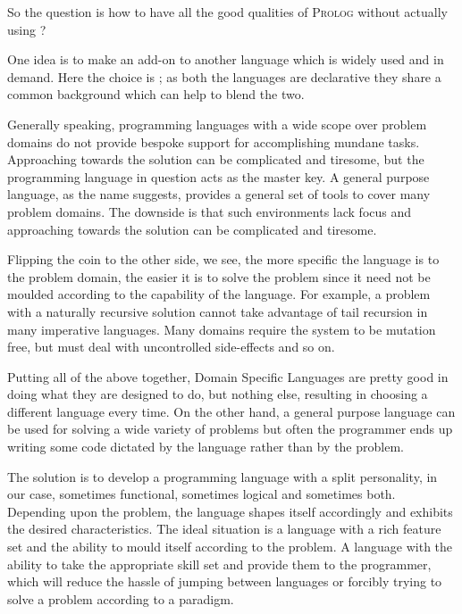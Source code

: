 \documentclass[thesis-solanki.tex]{subfiles}
\begin{document}
So the question is how to have all the good qualities of \textsc{Prolog} without actually using ?

One idea is to make  an add-on to another language which is widely used and in demand.
Here the choice is ; as both the languages are declarative they share a common background which can
help to blend the two.

Generally speaking, programming languages with a wide scope over problem domains do not provide bespoke support for
accomplishing  mundane tasks.
Approaching towards the solution can be complicated and tiresome, but the programming language in question acts as the
master key.%
A general purpose language, as the name suggests{\large ,} provides a general set of tools to cover many
problem domains.
The downside is that such environments lack focus and approaching towards the solution can be complicated and
tiresome.


Flipping the coin to the other side, we see, the more specific the language is to the problem domain, the easier it
is to solve the problem since it need not be moulded according to the capability  of the
language.
For example, a problem with a naturally recursive solution cannot take advantage of tail recursion in many
imperative languages.
Many domains require the system to be mutation free, but must deal with uncontrolled side-effects and so
on.

Putting all of the above together, Domain Specific Languages
are pretty good in doing what they are designed to do, but nothing else, resulting in choosing a different language
every time.
On the other hand, a general purpose language can be used for solving a wide variety of problems but often the
programmer ends up writing some code dictated by the language rather than by the problem.

The solution is to develop a programming language with a split personality, in our case, sometimes functional,
sometimes logical and sometimes both.
Depending upon the problem, the language shapes itself accordingly and exhibits the desired characteristics.
The ideal situation is a language with a rich feature set and the ability to mould itself according to the problem.
A language with the ability to take the appropriate skill set and provide them to the programmer, which will reduce
the hassle of jumping between languages or forcibly trying to solve a problem according to a
paradigm.
\end{document}
